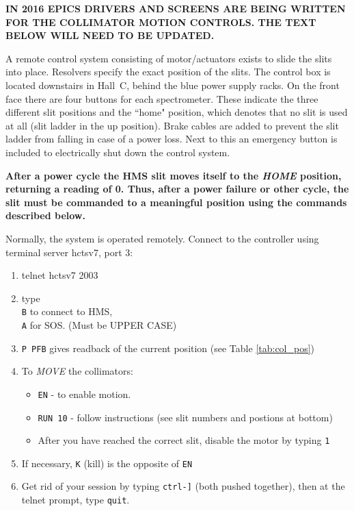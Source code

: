 {{\bf IN 2016 EPICS DRIVERS AND SCREENS ARE BEING WRITTEN FOR 
THE COLLIMATOR MOTION CONTROLS. THE TEXT BELOW WILL NEED TO BE UPDATED.}

A remote control system consisting of motor/actuators exists to slide
the slits into place. Resolvers specify the exact position of the
slits.  The control box is located downstairs in Hall~C, behind the
blue power supply racks. On the front face there are four buttons for
each spectrometer. These indicate the three different slit positions
and the ``home" position, which denotes that no slit is used at all
(slit ladder in the up position).  Brake cables are added to prevent
the slit ladder from falling in case of a power loss. Next to this an
emergency button is included to electrically shut down the control
system.

{\bf After a power cycle the HMS slit moves itself to the {\it HOME} position,
returning a reading of 0. Thus, after a power failure or other cycle, the slit
must be commanded to a meaningful position using the commands described below.}


Normally, the system is operated remotely. Connect to the controller
using terminal server hctsv7, port 3:

\begin{minipage}{6in}
\begin{enumerate}
\item telnet hctsv7 2003
\item type \texttt{\\B} to connect to HMS, \texttt{\\A} for SOS. (Must be UPPER CASE)
\item {\tt P PFB} gives readback of the current position (see Table \ref{tab:col_pos})
\item To {\em MOVE} the collimators:
   \begin{itemize}
	\item {\tt EN} - to enable motion.
	\item {\tt RUN 10} - follow instructions (see slit numbers and postions at bottom)
	\item After you have reached the correct slit, disable the motor by typing {\tt 1}

   \end{itemize}
\item If necessary, \texttt{K} (kill) is the opposite of \texttt{EN}
\item Get rid of your session by typing \texttt{ctrl-]} (both pushed together), then
at the telnet prompt, type \texttt{quit}.
\end{enumerate}
\end{minipage}

}
